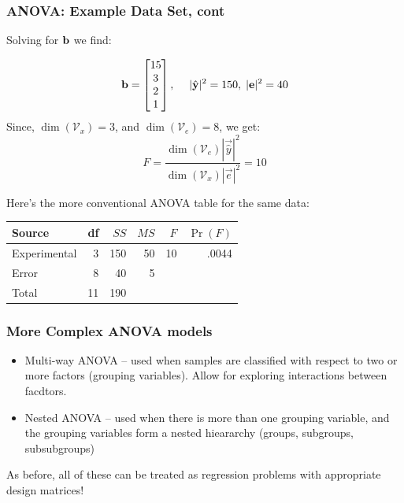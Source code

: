 \documentclass{beamer}
\begin{document}
\begin{frame}[fragile]
  \frametitle{ANOVA: Example Data Set, cont}
\small

Solving for $\mathbf{b}$ we find:

\begin{equation*}
\mathbf{b} = \begin{bmatrix}
15 \\ 3 \\ 2 \\ 1
\end{bmatrix},
\; \quad |\hat{\mathbf{y}}|^2 = 150, \;|\mathbf{e}|^2 = 40
\end{equation*}
Since, $\dim(\mathcal{V}_x) = 3$, and $\dim(\mathcal{V}_e)= 8$,  we get:
\begin{equation*}
  F = \frac{\dim(\mathcal{V}_e)|\vec{\hat{y}}|^2}
              {\dim(\mathcal{V}_x)|\vec{e}|^2}
    = 10
\end{equation*}

Here's the more conventional ANOVA table for the same data:
\footnotesize
\begin{center}
\begin{tabular}{lrrrrr}
  \toprule
 Source & df & $SS$ & $MS$ & $F$ & $\Pr(F)$ \\
  \midrule
 Experimental  & 3 & 150 & 50 & 10 & .0044\\
 Error  & 8  & 40 & 5 & \\
 \midrule
 Total & 11 & 190 & &\\
\bottomrule
\end{tabular}
\end{center}


\end{frame}


\begin{frame}[fragile]
  \frametitle{More Complex ANOVA models}

\begin{itemize}

\item Multi-way ANOVA -- used when samples are classified with respect to two or more factors (grouping variables). Allow for exploring interactions between facdtors.

\item Nested ANOVA -- used when there is more than one grouping variable, and the grouping variables form a nested hieararchy (groups, subgroups, subsubgroups)

\end{itemize}

As before, all of these can be treated as regression problems with appropriate design matrices!

\end{frame}
\end{document}
